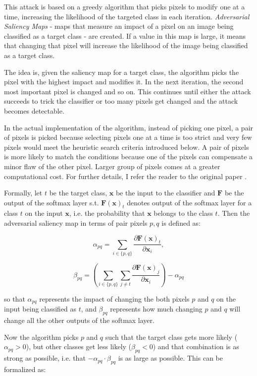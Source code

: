 This attack is based on a greedy algorithm that picks pixels to modify one at a time, increasing the likelihood of the targeted class in each iteration.  \textit{Adversarial Saliency Maps} - maps that measure an impact of a pixel on an image being classified as a target class - are created. If a value in this map is large, it means that changing that pixel will increase the likelihood of the image being classified as a target class. 

The idea is, given the saliency map for a target class, the algorithm picks the pixel with the highest impact and modifies it. In the next iteration, the second most important pixel is changed and so on. This continues until either the attack succeeds to trick the classifier or too many pixels get changed and the attack becomes detectable.

In the actual implementation of the algorithm, instead of picking one pixel, a pair of pixels is picked because selecting pixels one at a time is too strict and very few pixels would meet the heuristic search criteria introduced below. A pair of pixels is more likely to match the conditions because one of the pixels can compensate a minor flaw of the other pixel. Larger group of pixels comes at a greater computational cost. For further details, I refer the reader to the original paper \cite{DBLP:journals/corr/PapernotMJFCS15}.

Formally, let $t$ be the target class, $\pmb x$ be the input to the classifier and $\pmb F$ be the output of the softmax layer s.t. $ \pmb F(\pmb x)_t$ denotes output of the softmax layer for a class $t$ on the input $\pmb x$, i.e. the probability that $\pmb x$ belongs to the class $t$. Then the adversarial saliency map in terms of pair pixels $p, q$ is defined as:

\[
\alpha_{pq} = \sum_{i \in \{p,q\}} \frac{\partial \pmb F(\pmb x)_t}{\partial \pmb x_i},
\]

\[
\beta_{pq} = ( \sum_{i \in \{p,q\}} \sum_{j \neq t} \frac{\partial \pmb F (\pmb x)_j }{\partial \pmb x _i}) - \alpha_{pq}
\]

so that $\alpha_{pq}$ represents the impact of changing the both pixels $p$ and $q$ on the input being classified as $t$, and $\beta_{pq}$ represents how
much changing $p$ and $q$ will change all the other outputs of the softmax layer.

Now the algorithm picks $p$ and $q$ such that the target class gets more likely ($\alpha_{pq} > 0$), but other classes get less likely ($\beta_{pq} < 0$) and that combination is as strong as possible, i.e. that $ - \alpha_{pq} \cdot \beta_{pq}$ is as large as possible. This can be formalized as:

